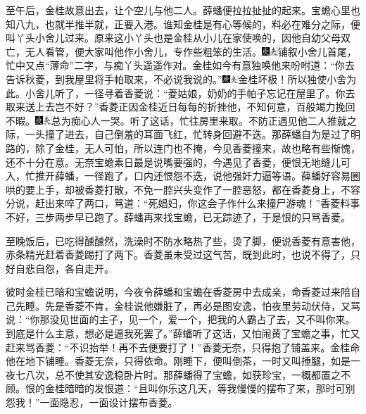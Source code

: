 至午后，金桂故意出去，让个空儿与他二人。薛蟠便拉拉扯扯的起来。宝蟾心里也知八九，也就半推半就，正要入港。谁知金桂是有心等候的，料必在难分之际，便叫丫头小舍儿过来。原来这小丫头也是金桂从小儿在家使唤的，因他自幼父母双亡，无人看管，便大家叫他作小舍儿，专作些粗笨的生活。{\includegraphics[width=3mm]{../Images/00004}\includegraphics[width=3mm]{../Images/00012}\footnotesize \kaishu 铺叙小舍儿首尾，忙中又点“薄命”二字，与痴丫头遥遥作对。}金桂如今有意独唤他来吩咐道：“你去告诉秋菱，到我屋里将手帕取来，不必说我说的。”{\includegraphics[width=3mm]{../Images/00004}\includegraphics[width=3mm]{../Images/00012}\footnotesize \kaishu 金桂坏极！所以独使小舍为此。}小舍儿听了，一径寻着香菱说：“菱姑娘，奶奶的手帕子忘记在屋里了。你去取来送上去岂不好？”香菱正因金桂近日每每的折挫他，不知何意，百般竭力挽回不暇。{\includegraphics[width=3mm]{../Images/00004}\includegraphics[width=3mm]{../Images/00012}\footnotesize \kaishu 总为痴心人一哭。}听了这话，忙往房里来取。不防正遇见他二人推就之际，一头撞了进去，自己倒羞的耳面飞红，忙转身回避不迭。那薛蟠自为是过了明路的，除了金桂，无人可怕，所以连门也不掩，今见香菱撞来，故也略有些惭愧，还不十分在意。无奈宝蟾素日最是说嘴要强的，今遇见了香菱，便恨无地缝儿可入，忙推开薛蟠，一径跑了，口内还恨怨不迭，说他强奸力逼等语。薛蟠好容易圈哄的要上手，却被香菱打散，不免一腔兴头变作了一腔恶怒，都在香菱身上，不容分说，赶出来啐了两口，骂道：“死娼妇，你这会子作什么来撞尸游魂！”香菱料事不好，三步两步早已跑了。薛蟠再来找宝蟾，已无踪迹了，于是恨的只骂香菱。

至晚饭后，已吃得醺醺然，洗澡时不防水略热了些，烫了脚，便说香菱有意害他，赤条精光赶着香菱踢打了两下。香菱虽未受过这气苦，既到此时，也说不得了，只好自悲自怨，各自走开。

彼时金桂已暗和宝蟾说明，今夜令薛蟠和宝蟾在香菱房中去成亲，命香菱过来陪自己先睡。先是香菱不肯，金桂说他嫌脏了，再必是图安逸，怕夜里劳动伏侍，又骂说：“你那没见世面的主子，见一个，爱一个，把我的人霸占了去，又不叫你来。到底是什么主意，想必是逼我死罢了。”薛蟠听了这话，又怕闹黄了宝蟾之事，忙又赶来骂香菱：“不识抬举！再不去便要打了！”香菱无奈，只得抱了铺盖来。金桂命他在地下铺睡。香菱无奈，只得依命。刚睡下，便叫倒茶，一时又叫捶腿，如是一夜七八次，总不使其安逸稳卧片时。那薛蟠得了宝蟾，如获珍宝，一概都置之不顾。恨的金桂暗暗的发恨道：“且叫你乐这几天，等我慢慢的摆布了来，那时可别怨我！”一面隐忍，一面设计摆布香菱。

